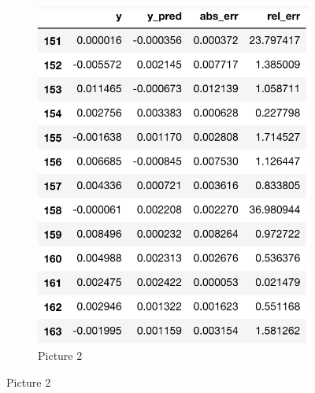 \documentclass{article}%
\begin{document}
\begin{figure}
\begin{subfigure}[b]{0.6\textwidth}
    \includegraphics[width=\textwidth]{pred_step1.png}
    \caption{Picture 2}
    \label{fig:2}
  \end{subfigure}
\end{figure}
\fi
\end{document}
